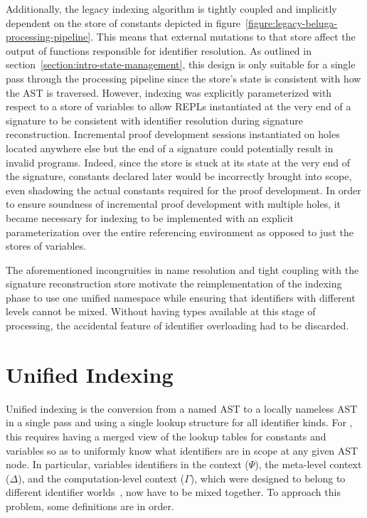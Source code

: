 Additionally, the legacy indexing algorithm is tightly coupled and implicitly dependent on the store of constants depicted in figure~\ref{figure:legacy-beluga-processing-pipeline}.
This means that external mutations to that store affect the output of functions responsible for identifier resolution.
As outlined in section~\ref{section:intro-state-management}, this design is only suitable for a single pass through the processing pipeline since the store's state is consistent with how the \ac{AST} is traversed.
However, indexing was explicitly parameterized with respect to a store of variables to allow \acp{REPL} instantiated at the very end of a \Beluga signature to be consistent with identifier resolution during signature reconstruction.
Incremental proof development sessions instantiated on holes located anywhere else but the end of a \Beluga signature could potentially result in invalid programs.
Indeed, since the store is stuck at its state at the very end of the \Beluga signature, constants declared later would be incorrectly brought into scope, even shadowing the actual constants required for the proof development.
In order to ensure soundness of incremental proof development with multiple holes, it became necessary for indexing to be implemented with an explicit parameterization over the entire referencing environment as opposed to just the stores of variables.

The aforementioned incongruities in name resolution and tight coupling with the signature reconstruction store motivate the reimplementation of the indexing phase to use one unified namespace while ensuring that identifiers with different levels cannot be mixed.
Without having types available at this stage of processing, the accidental feature of identifier overloading had to be discarded.

\section{Unified Indexing}\label{section:indexing}


Unified indexing is the conversion from a named \ac{AST} to a locally nameless \ac{AST} in a single pass and using a single lookup structure for all identifier kinds.
For \Beluga, this requires having a merged view of the lookup tables for constants and variables so as to uniformly know what identifiers are in scope at any given \ac{AST} node.
In particular, variables identifiers in the \LF context ($\Psi$), the meta-level context ($\Delta$), and the computation-level context ($\Gamma$), which were designed to belong to different identifier worlds~\cite{ferreira2012compiler}, now have to be mixed together.
To approach this problem, some definitions are in order.

